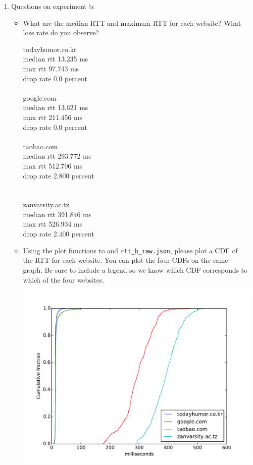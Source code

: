 \documentclass[10pt]{article}
\begin{document}
\begin{enumerate}
\item Questions on experiment b:

\begin{itemize}

\item What are the median RTT and maximum RTT for each website? What loss rate do you observe?

todayhumor.co.kr \\
median rtt 13.235 ms\\
max rtt 97.743 ms\\
drop rate 0.0 percent\\
\\
google.com \\
median rtt 13.621 ms\\
max rtt 211.456 ms\\
drop rate 0.0 percent\\
\\
taobao.com \\
median rtt 293.772 ms\\
max rtt 512.706 ms\\
drop rate 2.800 percent\\
\\
\\
zanvarsity.ac.tz \\
median rtt 391.846 ms\\
max rtt 526.934 ms\\
drop rate 2.400 percent

\item Using the plot functions to and \texttt{rtt\_b\_raw.json}, please plot a CDF of the RTT for each website. You can plot the four CDFs on the same graph. Be sure to include a legend so we know which CDF corresponds to which of the four websites.

\includegraphics[scale=0.5]{plot_ping.pdf}
\\
\\
\\
\\
\\
\\
\end{itemize}


\end{enumerate}
\end{document}
